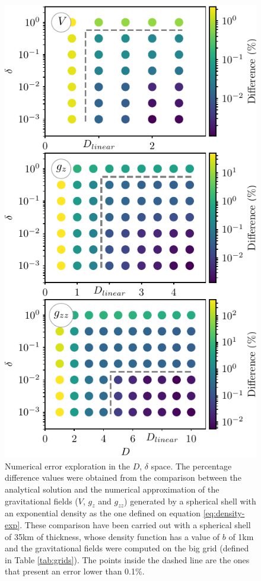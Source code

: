 \documentclass[extra]{gji}
\begin{document}
\begin{figure}
\centering
\includegraphics[width=\linewidth]
    {figures/grid-search.pdf}
\caption{
    Numerical error exploration in the $D$, $\delta$ space.
    The percentage difference values were obtained from the comparison 
    between the analytical solution and the numerical approximation of 
    the gravitational fields ($V$, $g_z$ and $g_{zz}$) generated by a 
    spherical shell with an exponential density as the one defined on 
    equation \ref{eq:density-exp}.
    These comparison have been carried out with a spherical shell of 
    35km of thickness, whose density function has a value of $b$ of 1km 
    and the gravitational fields were computed on the big grid 
    (defined in Table \ref{tab:grids}).
    The points inside the dashed line are the ones that present an 
    error lower than 0.1\%.
    }
\label{fig:grid-search}
\end{figure}
\end{document}
